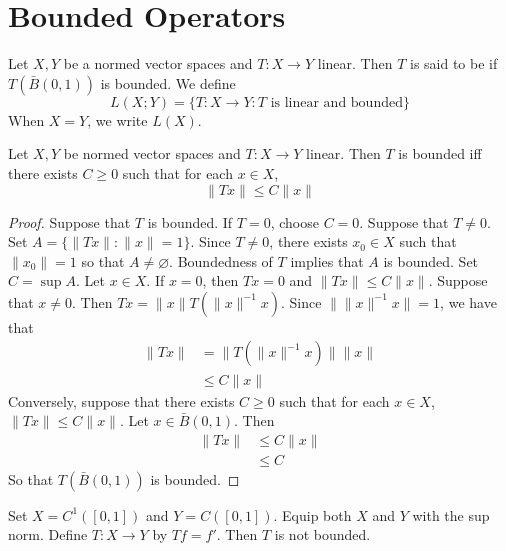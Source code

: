 \documentclass{book}
\begin{document}
	
	
	
	
	
	
	
	
	
	
	
	
	\newpage
	\section{Bounded Operators}
	
	\begin{defn}  
		Let $X,Y$ be a normed vector spaces and $T:X \rightarrow Y$ linear. Then $T$ is said to be  if $T(\bar{B}(0,1))$ is bounded. We define $$L(X; Y) = \{T:X \rightarrow Y: T \text{ is linear and bounded}\}$$
		When $X=Y$, we write $L(X)$.
	\end{defn}
	
	\begin{ex}  
		Let $X,Y$ be normed vector spaces and $T:X \rightarrow Y$ linear. Then $T$ is bounded iff there exists $C \geq 0$ such that for each $x \in X$, $$\|Tx \|\leq C \|x \|$$ 
	\end{ex}
	
	\begin{proof}
	Suppose that $T$ is bounded. If $T = 0$, choose $C = 0$. Suppose that $T \neq 0$. Set $ A = \{\|Tx\|: \|x\| =1\}$. Since $T \neq 0$, there exists $x_0 \in X$ such that $\|x_0\| = 1$ so that $A \neq \varnothing$.  Boundedness of $T$ implies that $A$ is bounded. Set $C = \sup A$. Let $x \in X$. If $x = 0$, then $Tx = 0$ and $\|Tx\| \leq C \|x\|$. Suppose that $x \neq 0$. Then $Tx = \|x\| T(\|x\|^{-1} x)$. Since $\|\|x\|^{-1} x\| = 1$, we have that
	\begin{align*}
	\|Tx\|
	&= \|T(\|x\|^{-1} x)\| \|x\|  \\
	& \leq C\|x\| 
\end{align*}	
Conversely, suppose that there exists $C \geq 0$ such that for each $x \in X$, $\|Tx \|\leq C \|x \|$. Let $x \in \bar{B}(0,1)$. Then 
	\begin{align*}
	\|Tx\| 
	&\leq C \|x\| \\
	&\leq C
	\end{align*}
So that $T(\bar{B}(0,1))$ is bounded. 
	\end{proof}
	
	\begin{ex} 
	Set $X = C^{1}([0,1])$ and $Y = C([0,1])$. Equip both $X$ and $Y$ with the sup norm. Define $T:X \rightarrow Y$ by $Tf = f'$. Then $T$ is not bounded.
	\end{ex}
	
\end{document}
